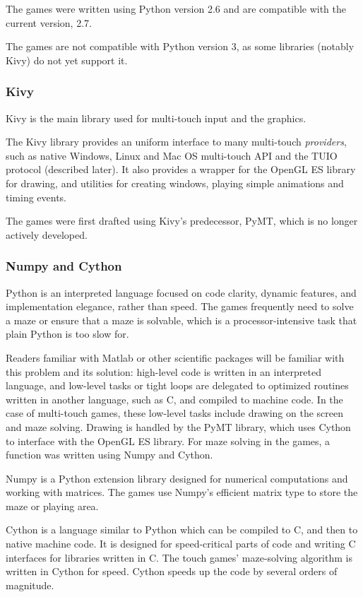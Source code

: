 \documentclass[a4paper,11pt]{article}
\begin{document}
The games were written using Python version 2.6 and are compatible with
the current version, 2.7.

The games are not compatible with Python version 3, as some libraries (notably
Kivy) do not yet support it.

\subsubsection{Kivy}

Kivy is the main library used for multi-touch input and the graphics.

The Kivy library provides an uniform interface to many multi-touch
\emph{providers}, such as native Windows, Linux and Mac OS multi-touch API and
the TUIO protocol (described later).
It also provides a wrapper for the OpenGL ES library for drawing, and utilities
for creating windows, playing simple animations and timing events.

The games were first drafted using Kivy's predecessor, PyMT, which is
no longer actively developed.

\subsubsection{Numpy and Cython}

Python is an interpreted language focused on code clarity, dynamic features,
and implementation elegance, rather than speed.
The games frequently need to solve a maze or ensure that a maze is solvable,
which is a processor-intensive task that plain Python is too slow for.

Readers familiar with Matlab or other scientific packages will be familiar with
this problem and its solution: high-level code is written in an interpreted
language, and low-level tasks or tight loops are delegated to optimized
routines written in another language, such as C, and compiled to machine code.
In the case of multi-touch games, these low-level tasks include drawing on the
screen and maze solving.
Drawing is handled by the PyMT library, which uses Cython to interface with
the OpenGL ES library.
For maze solving in the games, a function was written using Numpy and Cython.

Numpy is a Python extension library designed for numerical computations and
working with matrices.
The games use Numpy's efficient matrix type to store the maze or playing area.

Cython is a language similar to Python which can be compiled to C, and then to
native machine code.
It is designed for speed-critical parts of code and writing C interfaces
for libraries written in C.
The touch games' maze-solving algorithm is written in Cython for speed.
Cython speeds up the code by several orders of magnitude.
\end{document}
